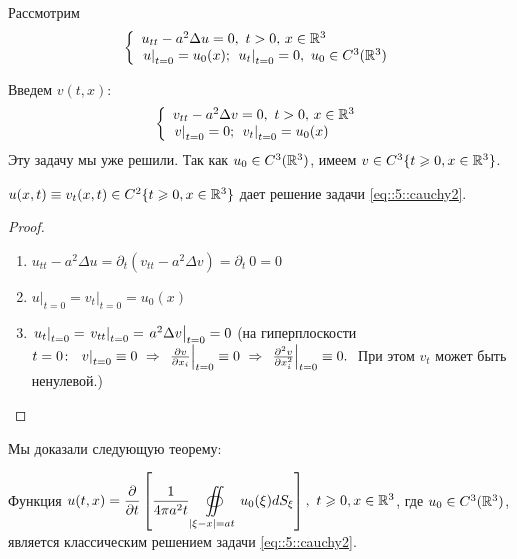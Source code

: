 \documentclass[../main.tex]{subfiles}
\begin{document}
Рассмотрим
\begin{equation}
\left\{
  \begin{array}{ll}
  u_{tt}-a^2\Delta u=0,\ t>0,\, x\in \mathbb{R}^3\\
  \left. u\right|_{t=0}=u_0(x);\ \left. u_t\right|_{t=0}=0,\ u_0\in C^3(\mathbb{R}^3)
  \end{array}
\right.
\label{eq::5::cauchy2}
\end{equation}

Введем $v(t, x)$:
\[
\left\{
  \begin{array}{ll}
  v_{tt}-a^2\Delta v=0,\ t>0,\, x\in \mathbb{R}^3\\
  \left. v\right|_{t=0}=0;\ \left. v_t\right|_{t=0}=u_0(x)
  \end{array}
\right.
\]
Эту задачу мы уже решили. Так как $u_0\in C^3(\mathbb{R}^3)$, имеем $v\in C^3\{t\geqslant 0, x\in\mathbb{R}^3\}$.
\begin{statement}
$u(x, t)\equiv v_t(x, t)\in C^2\{t\geqslant 0, x\in\mathbb{R}^3 \}$ дает решение задачи \eqref{eq::5::cauchy2}.
\end{statement}
\begin{proof}$\ $
\begin{enumerate}
\item $u_{tt} - a^2 \Delta u = \partial_t (v_{tt} - a^2 \Delta v) = \partial_t\: 0 = 0$
\item $\left. u\right|_{t=0}=\left. v_t\right|_{t=0}=u_0(x)$
\item $\left. u_t\right|_{t=0} = \left. v_{tt}\right|_{t=0}=\left. a^2 \Delta v\right|_{t=0}=0$ (на гиперплоскости $t=0\colon\ \while{v}{t=0} \equiv 0\ \Rightarrow\ \while{\pd{v}{x_i}}{t=0} \equiv 0\ \Rightarrow\ \while{\pdd{v}{x_i}}{t=0} \equiv 0.\;$ При этом $v_t$ может быть ненулевой.)
\end{enumerate}
\end{proof}
Мы доказали следующую теорему:
\begin{theorem}
Функция $u(t,x)=\dfrac{\partial}{\partial t}\left[\dfrac{1}{4\pi a^2t}\displaystyle\oiint\limits_{|\xi -x|=at}u_0(\xi )dS_{\xi } \right],\ t\geqslant 0,x\in\mathbb{R}^3$, где $u_0\in C^3(\mathbb{R}^3)$, \\[1em]
является классическим решением задачи \eqref{eq::5::cauchy2}. 
\end{theorem}
\end{document}
